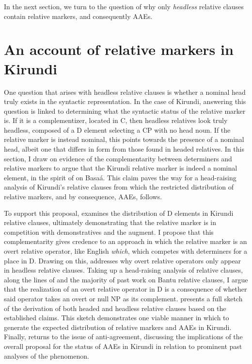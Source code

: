 \documentclass[output=paper,colorlinks,citecolor=brown
]{langscibook}
\begin{document}
\noindent In the next section, we turn to the question of why only \emph{headless} relative clauses contain relative markers, and consequently AAEs.


\section{An account of relative markers in Kirundi} \label{sec:myers:proposal}

One question that arises with headless relative clauses is whether a nominal head truly exists in the syntactic representation. In the case of Kirundi, answering this question is linked to determining what the syntactic status of the relative marker is. If it is a complementizer, located in C, then headless relatives look truly headless, composed of a D element selecting a CP with no head noun. If the relative marker is instead nominal, this points towards the presence of a nominal head, albeit one that differs in form from those found in headed relatives. In this section, I 
draw on evidence of the complementarity between determiners and relative markers to argue that the Kirundi relative marker is indeed a nominal element, in the spirit of \citet{Jenksetal:2017} on Basaá. This claim paves the way for a head-raising analysis of Kirundi's relative clauses from which the restricted distribution of relative markers, and by consequence, AAEs, follows.


To support this proposal,  examines the distribution of D elements in Kirundi relative clauses, ultimately demonstrating that the relative marker is in competition with demonstratives and the augment. I propose that this complementarity gives credence to an approach in which the relative marker is an overt relative operator, like English \emph{which}, which competes with determiners for a place in D. Drawing on this,  addresses why overt relative operators only appear in headless relative clauses. Taking up a head-raising analysis of relative clauses, along the lines of \citet{Kayne:1994} and the majority of past work on Bantu relative clauses, I argue that the realization of an overt relative operator in D is a consequence of whether said operator takes an overt or null NP as its complement.  presents a full sketch of the derivation of both headed and headless relative clauses based on the established claims. This sketch demonstrates one viable manner in which to generate the expected distribution of relative markers and AAEs in Kirundi. Finally,  returns to the issue of anti-agreement, discussing the implications of the overall proposal for the status of AAEs in Kirundi in relation to prominent past analyses of the phenomenon.
\end{document}
